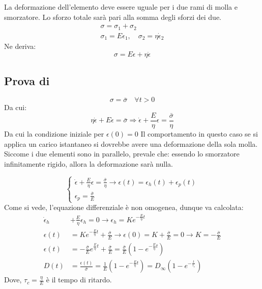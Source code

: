 La deformazione dell'elemento deve essere uguale per i due rami di molla e smorzatore.
Lo sforzo totale sarà pari alla somma degli sforzi dei due.
\begin{equation}
\begin{split}
\sigma = \sigma_1 + \sigma_2\\
\sigma_1 = E \epsilon_1, \quad \sigma_2 = \eta \dot{\epsilon}_2
\end{split}
\end{equation}
Ne deriva:
\begin{equation}
\sigma = E \epsilon + \eta \dot{\epsilon}
\end{equation}
\subsection{Prova di }
\begin{equation}
\sigma = \bar{\sigma} \quad \forall t > 0
\end{equation}
Da cui:
\begin{equation}
\eta \dot{\epsilon} + E \epsilon = \bar{\sigma} \Rightarrow \dot{\epsilon} + \frac{E}{\eta}\epsilon = \frac{\bar{\sigma}}{\eta}
\end{equation}
Da cui la condizione iniziale per $\epsilon(0) = 0$
Il comportamento in questo caso se si applica un carico istantaneo si dovrebbe avere una deformazione della sola molla.
Siccome i due elementi sono in parallelo, prevale che: essendo lo smorzatore infinitamente rigido, allora la deformazione sarà nulla.

\begin{equation}
\begin{cases}
 \dot{\epsilon} + \frac{E}{\eta}\epsilon = \frac{\bar{\sigma}}{\eta} \rightarrow \epsilon(t) = \epsilon_h(t) + \epsilon_p(t)\\
\epsilon_p=\frac{\bar{\sigma}}{E}
\end{cases}
\end{equation}
Come si vede, l'equazione differenziale è non omogenea, dunque va calcolata:
\begin{equation}
\begin{split}
\dot{\epsilon}_h &+ \frac{E}{\eta}\epsilon_h = 0 \rightarrow \epsilon_h = K e^{-\frac{E}{\eta}t}\\
\epsilon(t) &= K e^{-\frac{E}{\eta}t}+\frac{\bar{\sigma}}{E} \rightarrow \epsilon(0) = K + \frac{\bar{\sigma}}{E} = 0 \rightarrow K = -\frac{\bar{\sigma}}{E}\\
\epsilon(t) &= -\frac{\bar{\sigma}}{E}e^{\frac{E}{\eta}t}+\frac{\bar{\sigma}}{E} = \frac{\bar{\sigma}}{E}\left(1-e^{-\frac{E}{\eta}t}\right)\\
D(t) &= \frac{\epsilon(t)}{\bar{\sigma}} = \frac{1}{E}\left(1-e^{-\frac{E}{\eta}t}\right) = D_{\infty}\left(1-e^{-\frac{t}{\tau_c}}\right)
\end{split}
\end{equation}
Dove, $\tau_c = \frac{\eta}{E}$ è il tempo di ritardo.

